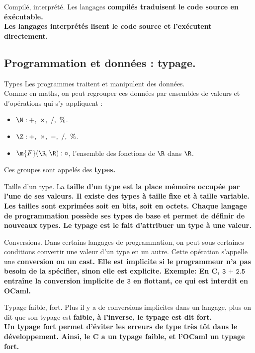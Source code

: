 \documentclass[french, 11pt]{article}
\begin{document}
\begin{defi}{Compilé, interprété.}{}
    Les langages \bf{compilés} traduisent le code source en éxécutable.\\
    Les langages \bf{interprétés} lisent le code source et l'exécutent directement.
\end{defi}

\subsection{Programmation et données : typage.}

\begin{defi}{Types}{}
    Les programmes traitent et manipulent des données.\\
    Comme en maths, on peut regrouper ces données par ensembles de valeurs et d'opérations qui s'y appliquent :
    \begin{itemize}[topsep=0pt,itemsep=-0.9 ex, label=---]
        \item $\N : +,~\times,~/,~\%$.
        \item $\Z : +,~\times,~-,~/,~\%$.
        \item $\m{F}(\R,\R) : \circ$, l'ensemble des fonctions de $\R$ dans $\R$.
    \end{itemize}
    Ces groupes sont appelés des \bf{types}.
\end{defi}

\begin{defi}{Taille d'un type.}{}
    La \bf{taille} d'un type est la place mémoire occupée par l'une de ses valeurs. Il existe des types à taille fixe et à taille variable. Les tailles sont exprimées soit en bits, soit en octets.\n
    Chaque langage de programmation possède ses types de base et permet de définir de nouveaux types. Le typage est le fait d'attribuer un type à une valeur.
\end{defi}

\begin{defi}{Conversions.}{}
    Dans certains langages de programmation, on peut sous certaines conditions convertir une valeur d'un type en un autre. Cette opération s'appelle une \bf{conversion} ou un cast. Elle est \bf{implicite} si le programmeur n'a pas besoin de la spécifier, sinon elle est \bf{explicite}.\n
    \bf{Exemple:} En C, $\texttt{3 + 2.5}$ entraîne la conversion implicite de $\texttt{3}$ en flottant, ce qui est interdit en OCaml.
\end{defi}

\begin{defi}{Typage faible, fort.}{}
    Plus il y a de conversions implicites dans un langage, plus on dit que son typage est \bf{faible}, à l'inverse, le typage est dit \bf{fort}.\\
    Un typage fort permet d'éviter les erreurs de type très tôt dans le développement.\n
    Ainsi, le C a un typage faible, et l'OCaml un typage fort.
\end{defi}
\end{document}
